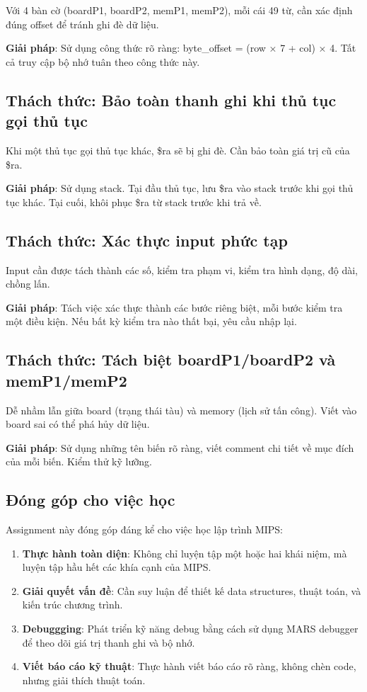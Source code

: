 Với 4 bàn cờ (boardP1, boardP2, memP1, memP2), mỗi cái 49 từ, cần xác định đúng offset để tránh ghi đè dữ liệu.

\textbf{Giải pháp}: Sử dụng công thức rõ ràng: byte\_offset = (row × 7 + col) × 4. Tất cả truy cập bộ nhớ tuân theo công thức này.

\subsection{Thách thức: Bảo toàn thanh ghi khi thủ tục gọi thủ tục}

Khi một thủ tục gọi thủ tục khác, \$ra sẽ bị ghi đè. Cần bảo toàn giá trị cũ của \$ra.

\textbf{Giải pháp}: Sử dụng stack. Tại đầu thủ tục, lưu \$ra vào stack trước khi gọi thủ tục khác. Tại cuối, khôi phục \$ra từ stack trước khi trả về.

\subsection{Thách thức: Xác thực input phức tạp}

Input cần được tách thành các số, kiểm tra phạm vi, kiểm tra hình dạng, độ dài, chồng lấn.

\textbf{Giải pháp}: Tách việc xác thực thành các bước riêng biệt, mỗi bước kiểm tra một điều kiện. Nếu bất kỳ kiểm tra nào thất bại, yêu cầu nhập lại.

\subsection{Thách thức: Tách biệt boardP1/boardP2 và memP1/memP2}

Dễ nhầm lẫn giữa board (trạng thái tàu) và memory (lịch sử tấn công). Viết vào board sai có thể phá hủy dữ liệu.

\textbf{Giải pháp}: Sử dụng những tên biến rõ ràng, viết comment chi tiết về mục đích của mỗi biến. Kiểm thử kỹ lưỡng.

\subsection{Đóng góp cho việc học}

Assignment này đóng góp đáng kể cho việc học lập trình MIPS:

\begin{enumerate}
    \item \textbf{Thực hành toàn diện}: Không chỉ luyện tập một hoặc hai khái niệm, mà luyện tập hầu hết các khía cạnh của MIPS.
    
    \item \textbf{Giải quyết vấn đề}: Cần suy luận để thiết kế data structures, thuật toán, và kiến trúc chương trình.
    
    \item \textbf{Debuggging}: Phát triển kỹ năng debug bằng cách sử dụng MARS debugger để theo dõi giá trị thanh ghi và bộ nhớ.
    
    \item \textbf{Viết báo cáo kỹ thuật}: Thực hành viết báo cáo rõ ràng, không chèn code, nhưng giải thích thuật toán.
\end{enumerate}

